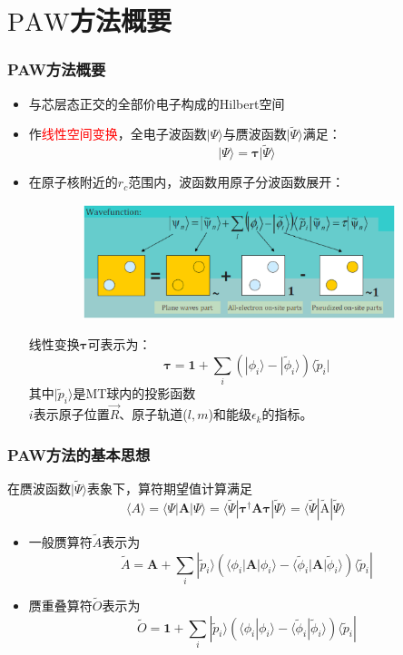 \documentclass[cjk,slidestop,compress,mathserif,blue]{beamer}
\begin{document}
\section{$\mathrm{PAW}$方法概要}
\frame
{
	\frametitle{\textrm{PAW}方法概要}
\begin{itemize}
	\item 与芯层态正交的全部价电子构成的\textrm{Hilbert}空间%
	\item 作\textcolor{red}{线性空间变换}，全电子波函数$|\Psi\rangle$与赝波函数$|\tilde\Psi\rangle$满足：
		$$|\Psi\rangle=\mathbf{\tau|}\tilde\Psi\rangle$$
	\item 在原子核附近的$r_c$范围内，波函数用原子分波函数展开：
\begin{figure}[h!]
\centering
\vspace*{-0.20in}
\hspace*{-0.30in}
\includegraphics[height=1.32in,width=4.0in,viewport=32 233 588 437,clip]{PAW_projector.eps}
\label{PAW_projector}
\end{figure}
线性变换$\mathbf{\tau}$可表示为：
$$\mathbf{\tau}=\mathbf{1}+\sum_i(|\phi_i\rangle-|\tilde\phi_i\rangle)\langle\tilde p_i|$$
其中$|\tilde p_i\rangle$是\textrm{MT}球内的投影函数\\
$i$表示原子位置$\vec R$、原子轨道($l,m$)和能级$\epsilon_k$的指标。
\end{itemize}	
}

\frame
{
\frametitle{\textrm{PAW}方法的基本思想}
在赝波函数$|\tilde\Psi\rangle$表象下，算符期望值计算满足$$\langle A \rangle=\langle\Psi|\mathbf{A}|\Psi\rangle=\langle\tilde\Psi|\mathbf{\tau}^{\dag}\mathbf{A}\mathbf{\tau}|\tilde\Psi\rangle=\langle\tilde\Psi|\tilde{\mathrm{A}}|\tilde\Psi\rangle$$
\begin{itemize}
	\item 一般赝算符$\tilde A$表示为
		$$\tilde A=\mathbf{A}+\sum_i|\tilde p_i\rangle(\langle\phi_i|\mathbf{A}|\phi_i\rangle-\langle\tilde\phi_i|\mathbf{A}|\tilde\phi_i\rangle)\langle\tilde p_i|$$
	\item 赝重叠算符$\tilde O$表示为
		$$\tilde O=\mathbf{1}+\sum_i|\tilde p_i\rangle(\langle\phi_i|\phi_i\rangle-\langle\tilde\phi_i|\tilde\phi_i\rangle)\langle\tilde p_i|$$
\end{itemize}
}
\end{document}
